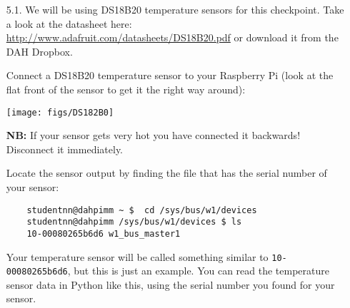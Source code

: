 \begin{enumerate}

\item [5.1.] We will be using DS18B20 temperature sensors for this checkpoint.
Take a look at the datasheet here: \url{http://www.adafruit.com/datasheets/DS18B20.pdf} or download it from the DAH Dropbox.

Connect a DS18B20 temperature sensor to your Raspberry Pi (look at the flat front of the sensor to get it the right way around):
\begin{center}
    \texttt{[image: figs/DS182B0]}
\end{center}
{\bf NB:} If your sensor gets very hot you have connected it backwards! Disconnect it immediately.


%

Locate the sensor output by finding the file that has the serial number of your sensor:
\begin{verbatim} 
    studentnn@dahpimm ~ $  cd /sys/bus/w1/devices 
    studentnn@dahpimm /sys/bus/w1/devices $ ls 
    10-00080265b6d6 w1_bus_master1 
\end{verbatim}



Your temperature sensor will be called something similar to \texttt{10-00080265b6d6}, but this is just an example.
You can read the temperature sensor data in Python like this, using the serial number you found for your sensor.



\end{enumerate}
